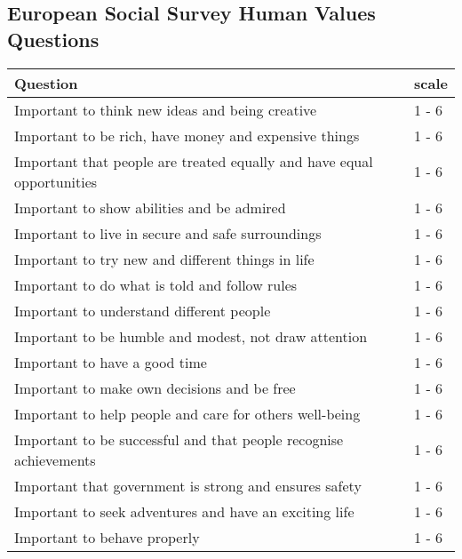 \begin{table*}[p]
\section{European Social Survey Human Values Questions}
\centering
    \begin{tabular}{|p{11.0cm}|p|}
        \hline
        Question                                                                & scale \\ \hline
        Important to think new ideas and being creative                         & 1 - 6 \\\hline
        Important to be rich, have money and expensive things                   & 1 - 6 \\\hline
        Important that people are treated equally and have equal opportunities  & 1 - 6 \\\hline
        Important to show abilities and be admired                              & 1 - 6 \\\hline
        Important to live in secure and safe surroundings                       & 1 - 6 \\\hline
        Important to try new and different things in life                       & 1 - 6 \\\hline
        Important to do what is told and follow rules                           & 1 - 6 \\\hline
        Important to understand different people                                & 1 - 6 \\\hline
        Important to be humble and modest, not draw attention                   & 1 - 6 \\\hline
        Important to have a good time                                           & 1 - 6 \\\hline
        Important to make own decisions and be free                             & 1 - 6 \\\hline
        Important to help people and care for others well-being                 & 1 - 6 \\\hline
        Important to be successful and that people recognise achievements       & 1 - 6 \\\hline
        Important that government is strong and ensures safety                  & 1 - 6 \\\hline
        Important to seek adventures and have an exciting life                  & 1 - 6 \\\hline
        Important to behave properly                                            & 1 - 6 \\\hline

\end{tabular}
\end{table*}
